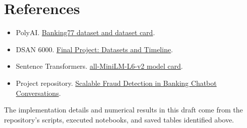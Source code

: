 \documentclass[
  english,
  11pt,
  letterpaper,
]{article}
\providecommand{\tightlist}{%
  \setlength{\itemsep}{0pt}\setlength{\parskip}{0pt}}
\begin{document}
\section*{References}\label{sec-references}

\begin{itemize}
\tightlist
\item
  PolyAI.
  \href{https://huggingface.co/datasets/PolyAI/banking77}{Banking77
  dataset and dataset card}.
\item
  DSAN 6000. \href{https://jjacobs.me/dsan6000/final-project/}{Final
  Project: Datasets and Timeline}.
\item
  Sentence Transformers.
  \href{https://huggingface.co/sentence-transformers/all-MiniLM-L6-v2}{all-MiniLM-L6-v2
  model card}.
\item
  Project repository.
  \href{https://github.com/MingyangHan-1021/DSAN6000-Project}{Scalable
  Fraud Detection in Banking Chatbot Conversations}.
\end{itemize}

The implementation details and numerical results in this draft come from
the repository's scripts, executed notebooks, and saved tables
identified above.
\end{document}
